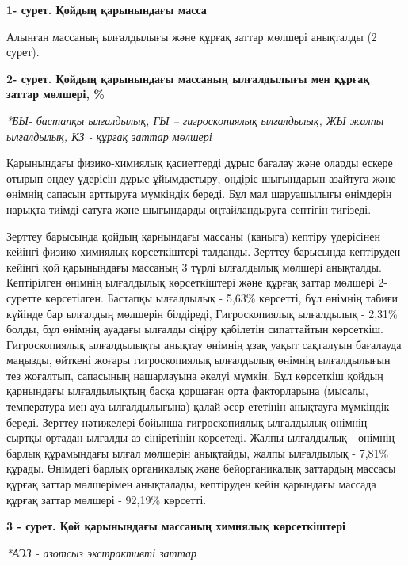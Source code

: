 {\bfseries 1- сурет. Қойдың қарынындағы масса}

Алынған массаның ылғалдылығы және құрғақ заттар мөлшері анықталды (2
сурет).

{\bfseries 2- сурет. Қойдың қарынындағы массаның ылғалдылығы мен құрғақ
заттар мөлшері, \%}

\emph{*БЫ- бастапқы ылғалдылық, ГЫ -- гигроскопиялық ылғалдылық, ЖЫ
жалпы ылғалдылық, ҚЗ - құрғақ заттар мөлшері}

Қарынындағы физико-химиялық қасиеттерді дұрыс бағалау және оларды ескере
отырып өңдеу үдерісін дұрыс ұйымдастыру, өндіріс шығындарын азайтуға
және өнімнің сапасын арттыруға мүмкіндік береді. Бұл мал шаруашылығы
өнімдерін нарықта тиімді сатуға және шығындарды оңтайландыруға септігін
тигізеді.

Зерттеу барысында қойдың қарнындағы массаны (каныга) кептіру үдерісінен
кейінгі физико-химиялық көрсеткіштері талданды. Зерттеу барысында
кептіруден кейінгі қой қарынындағы массаның 3 түрлі ылғалдылық мөлшері
анықталды. Кептірілген өнімнің ылғалдылық көрсеткіштері және құрғақ
заттар мөлшері 2- суретте көрсетілген. Бастапқы ылғалдылық - 5,63\%
көрсетті, бұл өнімнің табиғи күйінде бар ылғалдың мөлшерін білдіреді,
Гигроскопиялық ылғалдылық - 2,31\% болды, бұл өнімнің ауадағы ылғалды
сіңіру қабілетін сипаттайтын көрсеткіш. Гигроскопиялық ылғалдылықты
анықтау өнімнің ұзақ уақыт сақталуын бағалауда маңызды, өйткені жоғары
гигроскопиялық ылғалдылық өнімнің ылғалдылығын тез жоғалтып, сапасының
нашарлауына әкелуі мүмкін. Бұл көрсеткіш қойдың қарнындағы ылғалдылықтың
басқа қоршаған орта факторларына (мысалы, температура мен ауа
ылғалдылығына) қалай әсер ететінін анықтауға мүмкіндік береді. Зерттеу
нәтижелері бойынша гигроскопиялық ылғалдылық өнімнің сыртқы ортадан
ылғалды аз сіңіретінін көрсетеді. Жалпы ылғалдылық - өнімнің барлық
құрамындағы ылғал мөлшерін анықтайды, жалпы ылғалдылық - 7,81\% құрады.
Өнімдегі барлық органикалық және бейорганикалық заттардың массасы құрғақ
заттар мөлшерімен анықталады, кептіруден кейін қарындағы массада құрғақ
заттар мөлшері - 92,19\% көрсетті.

{\bfseries 3 - сурет. Қой қарынындағы массаның химиялық көрсеткіштері}

\emph{*АЭЗ - азотсыз экстрактивті заттар}

